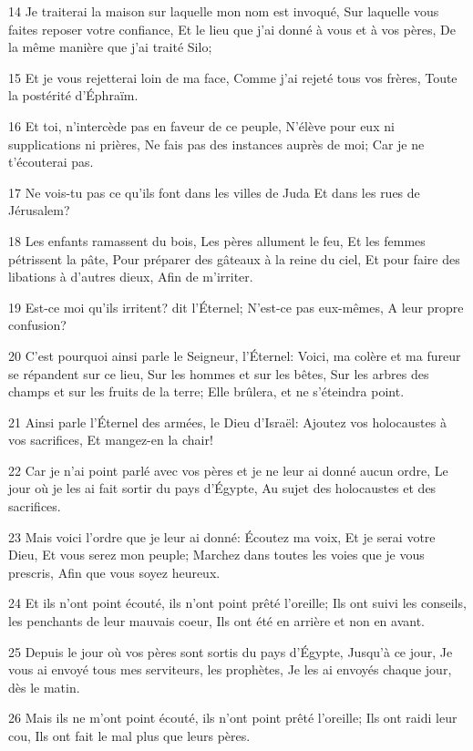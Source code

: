 \par 14 Je traiterai la maison sur laquelle mon nom est invoqué, Sur laquelle vous faites reposer votre confiance, Et le lieu que j'ai donné à vous et à vos pères, De la même manière que j'ai traité Silo;
\par 15 Et je vous rejetterai loin de ma face, Comme j'ai rejeté tous vos frères, Toute la postérité d'Éphraïm.
\par 16 Et toi, n'intercède pas en faveur de ce peuple, N'élève pour eux ni supplications ni prières, Ne fais pas des instances auprès de moi; Car je ne t'écouterai pas.
\par 17 Ne vois-tu pas ce qu'ils font dans les villes de Juda Et dans les rues de Jérusalem?
\par 18 Les enfants ramassent du bois, Les pères allument le feu, Et les femmes pétrissent la pâte, Pour préparer des gâteaux à la reine du ciel, Et pour faire des libations à d'autres dieux, Afin de m'irriter.
\par 19 Est-ce moi qu'ils irritent? dit l'Éternel; N'est-ce pas eux-mêmes, A leur propre confusion?
\par 20 C'est pourquoi ainsi parle le Seigneur, l'Éternel: Voici, ma colère et ma fureur se répandent sur ce lieu, Sur les hommes et sur les bêtes, Sur les arbres des champs et sur les fruits de la terre; Elle brûlera, et ne s'éteindra point.
\par 21 Ainsi parle l'Éternel des armées, le Dieu d'Israël: Ajoutez vos holocaustes à vos sacrifices, Et mangez-en la chair!
\par 22 Car je n'ai point parlé avec vos pères et je ne leur ai donné aucun ordre, Le jour où je les ai fait sortir du pays d'Égypte, Au sujet des holocaustes et des sacrifices.
\par 23 Mais voici l'ordre que je leur ai donné: Écoutez ma voix, Et je serai votre Dieu, Et vous serez mon peuple; Marchez dans toutes les voies que je vous prescris, Afin que vous soyez heureux.
\par 24 Et ils n'ont point écouté, ils n'ont point prêté l'oreille; Ils ont suivi les conseils, les penchants de leur mauvais coeur, Ils ont été en arrière et non en avant.
\par 25 Depuis le jour où vos pères sont sortis du pays d'Égypte, Jusqu'à ce jour, Je vous ai envoyé tous mes serviteurs, les prophètes, Je les ai envoyés chaque jour, dès le matin.
\par 26 Mais ils ne m'ont point écouté, ils n'ont point prêté l'oreille; Ils ont raidi leur cou, Ils ont fait le mal plus que leurs pères.
